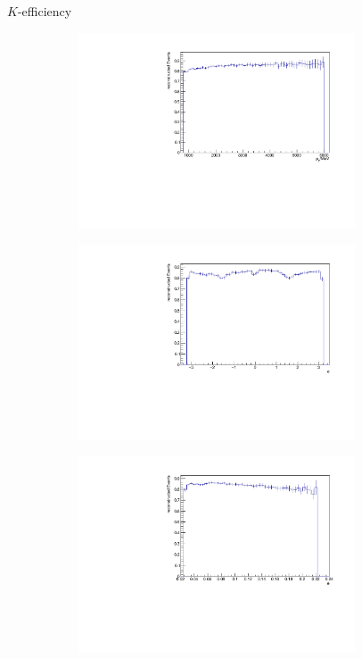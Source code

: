 \documentclass[11pt]{beamer}
\begin{document}
\begin{frame}{$K$-efficiency}
\begin{figure}
\begin{subfigure}{0.45\textwidth}
\includegraphics[width=0.9\textwidth]{up_pdf/neg/h_pt_reco_K_neg.pdf}
\end{subfigure}
\begin{subfigure}{0.45\textwidth}
\includegraphics[width=0.9\textwidth]{up_pdf/neg/h_phi_reco_K_neg.pdf}
\end{subfigure}
\begin{subfigure}{0.45\textwidth}
\includegraphics[width=0.9\textwidth]{up_pdf/neg/h_theta_reco_K_neg.pdf}

\end{subfigure}
\end{figure}
\end{frame}
\end{document}
